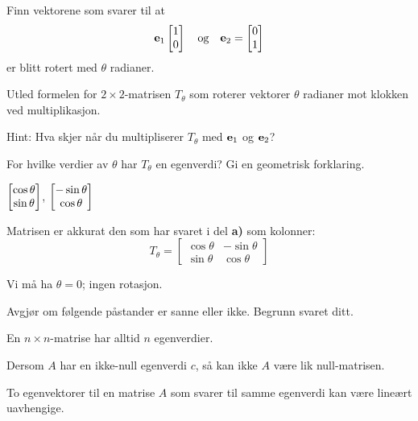 \begin{oppgave}

\begin{punkt}
Finn vektorene som svarer til at $$\mathbf{e}_1\begin{bmatrix} 1 \\ 0 \end{bmatrix}\quad \text{og}\quad\mathbf{e}_2= \begin{bmatrix} 0 \\ 1 \end{bmatrix}$$ er blitt rotert med $\theta$ radianer.
\end{punkt}

\begin{punkt}
Utled formelen for $2 \times 2$-matrisen $T_\theta$ som roterer vektorer $\theta$ radianer mot klokken ved multiplikasjon.

\noindent
Hint: Hva skjer når du multipliserer $T_\theta$ med $\mathbf{e}_1$ og $\mathbf{e}_2$?
\end{punkt}

\begin{punkt}
For hvilke verdier av $\theta$ har $T_\theta$ en egenverdi? Gi en geometrisk forklaring.
\end{punkt}


\end{oppgave}


\begin{losning}

\begin{punkt}
$\begin{bmatrix} \cos\theta \\ \sin\theta \end{bmatrix}$, $\begin{bmatrix} -\sin\theta \\ \cos\theta \end{bmatrix}$
\end{punkt}

\begin{punkt}
Matrisen er akkurat den som har svaret i del \textbf{a)} som kolonner:
$$T_\theta=\begin{bmatrix}
\cos\theta & -\sin\theta\\
\sin\theta & \cos\theta
\end{bmatrix}$$
\end{punkt}

\begin{punkt}
Vi må ha $\theta=0$; ingen rotasjon.
\end{punkt}

\end{losning}

\begin{oppgave}
Avgjør om følgende påstander er sanne eller ikke. Begrunn svaret ditt.

\begin{punkt}
En $n\times n$-matrise har alltid $n$ egenverdier.
\end{punkt}

\begin{punkt}
Dersom $A$ har en ikke-null egenverdi $c$, så kan ikke $A$ være lik null-matrisen.
\end{punkt}


\begin{punkt}
To egenvektorer til en matrise $A$ som svarer til samme egenverdi kan være lineært uavhengige.
\end{punkt}



\end{oppgave}

